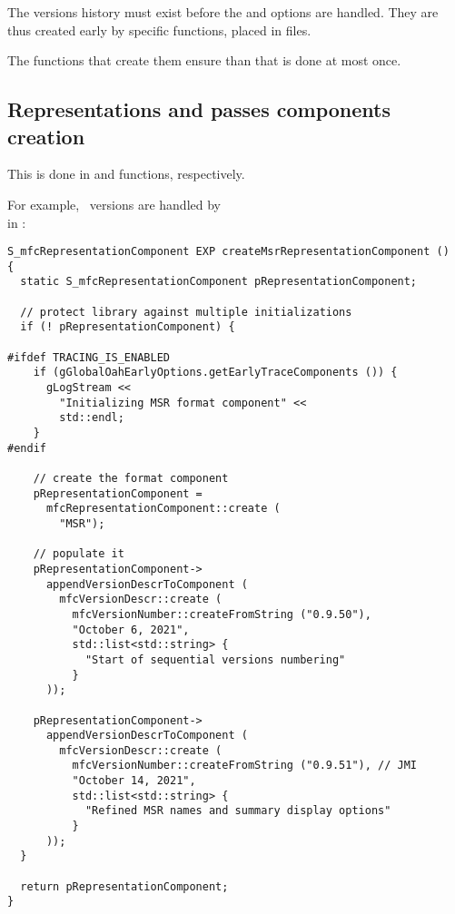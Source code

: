 The versions history must exist before the  and  options are handled. They are thus created early by specific functions, placed in  files.

The functions that create them ensure than that is done at most once.


\subsection{Representations and passes components creation}\label{Representations and passes components creation}

This is done in  and  functions, respectively.

For example, \msrRepr\ versions are handled by  \\
in :
\begin{lstlisting}[language=CPlusPlus]
S_mfcRepresentationComponent EXP createMsrRepresentationComponent ()
{
  static S_mfcRepresentationComponent pRepresentationComponent;

  // protect library against multiple initializations
  if (! pRepresentationComponent) {

#ifdef TRACING_IS_ENABLED
    if (gGlobalOahEarlyOptions.getEarlyTraceComponents ()) {
      gLogStream <<
        "Initializing MSR format component" <<
        std::endl;
    }
#endif

    // create the format component
    pRepresentationComponent =
      mfcRepresentationComponent::create (
        "MSR");

    // populate it
    pRepresentationComponent->
      appendVersionDescrToComponent (
        mfcVersionDescr::create (
          mfcVersionNumber::createFromString ("0.9.50"),
          "October 6, 2021",
          std::list<std::string> {
            "Start of sequential versions numbering"
          }
      ));

    pRepresentationComponent->
      appendVersionDescrToComponent (
        mfcVersionDescr::create (
          mfcVersionNumber::createFromString ("0.9.51"), // JMI
          "October 14, 2021",
          std::list<std::string> {
            "Refined MSR names and summary display options"
          }
      ));
  }

  return pRepresentationComponent;
}
\end{lstlisting}

